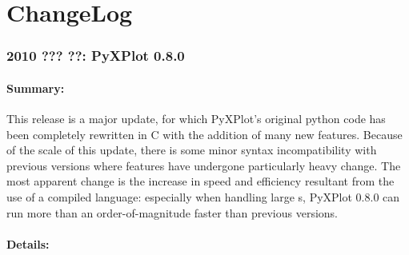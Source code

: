 %
%
%
%
%



\chapter{ChangeLog}

\subsection*{2010 ??? ??: PyXPlot 0.8.0}

\subsubsection*{Summary:}

This release is a major update, for which PyXPlot's original python code has
been completely rewritten in C with the addition of many new features. Because
of the scale of this update, there is some minor syntax incompatibility with
previous versions where features have undergone particularly heavy change. The
most apparent change is the increase in speed and efficiency resultant from the
use of a compiled language: especially when handling large \datafile s, PyXPlot
0.8.0 can run more than an order-of-magnitude faster than previous versions.

\subsubsection*{Details:}

